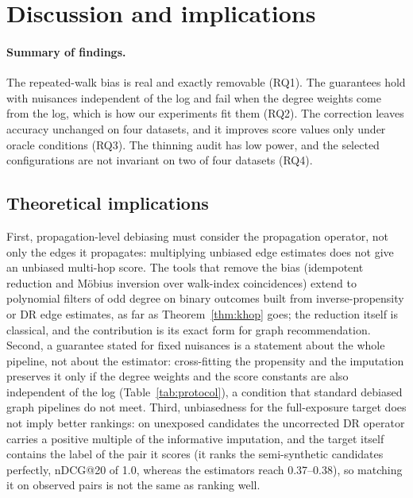\section{Discussion and implications}\label{sec:disc}

\paragraph{Summary of findings.} The repeated-walk bias is real and exactly removable
(RQ1). The guarantees hold with nuisances independent of the log and fail when the
degree weights come from the log, which is how our experiments fit them (RQ2). The
correction leaves accuracy unchanged on four datasets, and it improves score values
only under oracle conditions (RQ3). The thinning audit has low power, and the selected
configurations are not invariant on two of four datasets (RQ4).

\subsection{Theoretical implications}
First, propagation-level debiasing must consider the propagation operator, not only the
edges it propagates: multiplying unbiased edge estimates does not give an unbiased
multi-hop score. The tools that remove the bias (idempotent reduction and Möbius
inversion over walk-index coincidences) extend to polynomial filters of odd degree on
binary outcomes built from inverse-propensity or DR edge estimates, as far as
Theorem~\ref{thm:khop} goes; the reduction itself is classical, and the contribution is
its exact form for graph recommendation. Second, a guarantee stated for fixed nuisances
is a statement about the whole pipeline, not about the estimator: cross-fitting the
propensity and the imputation preserves it only if the degree weights and the score
constants are also independent of the log (Table~\ref{tab:protocol}), a condition that
standard debiased graph pipelines do not meet. Third, unbiasedness for the
full-exposure target does not imply better rankings: on unexposed candidates the
uncorrected DR operator carries a positive multiple of the informative imputation, and the
target itself contains the label of the pair it scores (it ranks the semi-synthetic
candidates perfectly, nDCG@20 of 1.0, whereas the estimators reach 0.37--0.38), so
matching it on observed pairs is not the same as ranking well.

